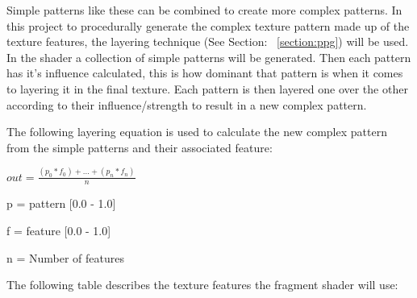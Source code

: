 \documentclass{report}
\begin{document}
Simple patterns like these can be combined to create more complex patterns. In this project to procedurally generate the complex texture pattern made up of the 
texture features, the layering technique (See Section: ~\ref{section:ppg}) will be used.\\
In the shader a collection of simple patterns will be generated. Then each pattern has it's influence calculated, this is how dominant that pattern is
when it comes to layering it in the final texture. Each pattern is then layered one over the other according to their influence/strength to result in
a new complex pattern.

The following layering equation is used to calculate the new complex pattern from the simple patterns and their associated feature:

\vspace{0.2cm}

\centerline{$out = \frac{(p_0 * f_0) + ... + (p_n * f_n)}{n}$}
\centerline{p = pattern [0.0 - 1.0]}
\centerline{f = feature [0.0 - 1.0]}
\centerline{n = Number of features}

The following table describes the texture features the fragment shader will use:
\end{document}
